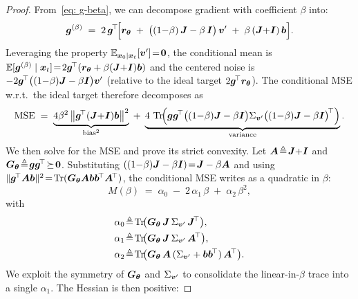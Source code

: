 \begin{appendices}
    \begin{proof}
        From~\eqref{eq: g-beta}, we can decompose gradient with coefficient $\beta$ into:
        \begin{equation}
            {\bm{g}}^{(\beta)} \;=\; 2\,{\bm{g}}^{\!\top}\!\Bigl[{\bm{r}}_{{\bm{\theta}}} \;+\; \bigl((1{-}\beta)\,{\bm{J}} - \beta\,{\bm{I}}\bigr)\,{\bm{v}}^{\prime} \;+\; \beta\,({\bm{J}}{+}{\bm{I}})\,{\bm{b}}\Bigr].
        \end{equation}
        Leveraging the property $\mathbb{E}_{{\bm{x}}_{0}\mid{\bm{x}}_{t}}[{\bm{v}}^{\prime}]\!=\!\bm{0}$, the conditional mean is $\mathbb{E}[{\bm{g}}^{(\beta)}\mid{\bm{x}}_{t}]\!=\!2{\bm{g}}^{\!\top}({\bm{r}}_{{\bm{\theta}}}+\beta({\bm{J}}{+}{\bm{I}}){\bm{b}})$ and the centered noise is $-2{\bm{g}}^{\!\top}\bigl((1{-}\beta){\bm{J}}-\beta{\bm{I}}\bigr){\bm{v}}^{\prime}$ (relative to the ideal target $2{\bm{g}}^{\!\top}{\bm{r}}_{{\bm{\theta}}}$). The conditional MSE w.r.t.\ the ideal target therefore decomposes as
        \begin{equation}
            \mathrm{MSE} \;=\; \underbrace{4\beta^{2}\,\bigl\|{\bm{g}}^{\!\top}({\bm{J}}{+}{\bm{I}}){\bm{b}}\bigr\|^{2}}_{\text{bias}^{2}} \;+\; \underbrace{4\,\operatorname{Tr}\!\Bigl({\bm{g}}{\bm{g}}^{\!\top}\bigl((1{-}\beta){\bm{J}}-\beta{\bm{I}}\bigr)\Sigma_{{\bm{v}}^{\prime}}\bigl((1{-}\beta){\bm{J}}-\beta{\bm{I}}\bigr)^{\!\top}\Bigr)}_{\text{variance}}.
        \end{equation}
        We then solve for the MSE and prove its strict convexity. Let ${\bm{A}}\!\triangleq\!{\bm{J}}{+}{\bm{I}}$ and ${\bm{G}}_{{\bm{\theta}}}\!\triangleq\!{\bm{g}}{\bm{g}}^{\!\top}\!\succeq\!\bm{0}$. Substituting $((1{-}\beta){\bm{J}}-\beta{\bm{I}})\!=\!{\bm{J}}-\beta{\bm{A}}$ and using $\|{\bm{g}}^{\!\top}{\bm{A}}{\bm{b}}\|^{2}\!=\!\operatorname{Tr}({\bm{G}}_{{\bm{\theta}}}{\bm{A}}{\bm{b}}{\bm{b}}^{\!\top}{\bm{A}}^{\!\top})$, the conditional MSE writes as a quadratic in $\beta$:
        \begin{equation}
            M(\beta) \;=\; \alpha_{0} \;-\; 2\,\alpha_{1}\,\beta \;+\; \alpha_{2}\,\beta^{2},
            \label{eq: m-beta-quadratic}
        \end{equation}
        with
        \begin{align*}
            \alpha_{0} &\!\triangleq\!\Tr\!\bigl(\mG_{\vtheta}\,\mJ\,\Sigma_{\vv^{\prime}}\,\mJ^{\!\top}\bigr),\\
            \alpha_{1} &\!\triangleq\!\Tr\!\bigl(\mG_{\vtheta}\,\mJ\,\Sigma_{\vv^{\prime}}\,\mA^{\!\top}\bigr),\\
            \alpha_{2} &\!\triangleq\!\Tr\!\bigl(\mG_{\vtheta}\,\mA\,(\Sigma_{\vv^{\prime}}+\vb\vb^{\!\top})\,\mA^{\!\top}\bigr).
        \end{align*}
        We exploit the symmetry of ${\bm{G}}_{{\bm{\theta}}}$ and $\Sigma_{{\bm{v}}^{\prime}}$ to consolidate the linear-in-$\beta$ trace into a single $\alpha_{1}$. The Hessian is then positive:

\end{proof}
\end{appendices}

